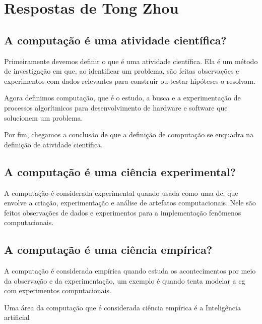 \section{Respostas de Tong Zhou}

\subsection{A computação é uma atividade científica?}

Primeiramente devemos definir o que é uma atividade científica. Ela é um método de investigação em que, ao identificar um problema, são feitas observações e experimentos com dados relevantes para construir ou testar hipóteses o resolvam.

Agora definimos computação, que é o estudo, a busca e a experimentação de processos algorítmicos para desenvolvimento de hardware e software que solucionem um problema. 

   
Por fim, chegamos a conclusão de que a definição de computação se enquadra na definição de atividade científica. 

\subsection{A computação é uma ciência experimental?}

A computação é considerada experimental quando usada como uma \gls{dc}, que envolve a criação, experimentação e análise de artefatos computacionais. Nele são feitos observações de dados e  experimentos para a implementação fenômenos computacionais.


\subsection{A computação é uma ciência empírica?}

A computação é considerada empírica quando estuda os acontecimentos por meio da observação e da experimentação, um exemplo é quando tenta modelar a \gls{cg} com experimentos computacionais. 


Uma área da computação que é considerada ciência empírica é a Inteligência artificial
